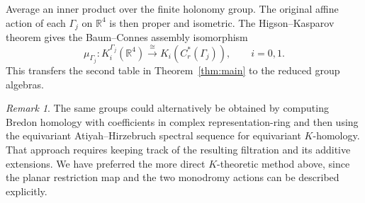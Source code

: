 \documentclass[11pt]{amsart}
\newcommand{\R}{\mathbb R}
\theoremstyle{remark}
\newtheorem{remark}[theorem]{Remark}
\numberwithin{equation}{section}
\begin{document}
Average an inner product over the finite holonomy group. The original affine action of each $\Gamma_j$ on $\R^4$ is then proper and isometric. The Higson--Kasparov theorem \cite{HK} gives the Baum--Connes assembly isomorphism
\[
 \mu_{\Gamma_j}\colon K_i^{\Gamma_j}(\R^4)
 \xrightarrow{\cong}K_i(C_r^*(\Gamma_j)),\qquad i=0,1.
\]
This transfers the second table in Theorem~\ref{thm:main} to the reduced group algebras. 

\begin{remark}
The same groups could alternatively be obtained by computing Bredon homology with coefficients in complex representation-ring and then using the equivariant Atiyah--Hirzebruch spectral sequence for equivariant $K$-homology. That approach requires keeping track of the resulting filtration and its additive extensions. We have preferred the more direct $K$-theoretic method above, since the planar restriction map and the two monodromy actions can be described explicitly.
\end{remark}
\end{document}
